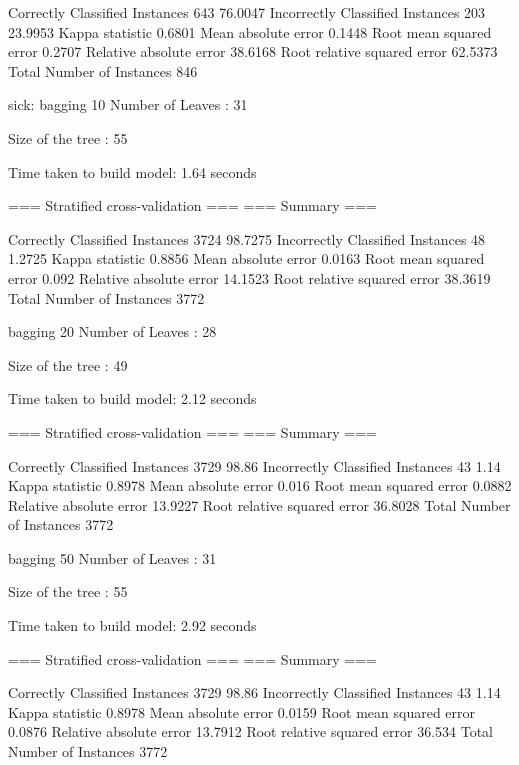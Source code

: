 Correctly Classified Instances         643               76.0047 %
Incorrectly Classified Instances       203               23.9953 %
Kappa statistic                          0.6801
Mean absolute error                      0.1448
Root mean squared error                  0.2707
Relative absolute error                 38.6168 %
Root relative squared error             62.5373 %
Total Number of Instances              846     



sick:
bagging 10
Number of Leaves  : 	31

Size of the tree : 	55




Time taken to build model: 1.64 seconds

=== Stratified cross-validation ===
=== Summary ===

Correctly Classified Instances        3724               98.7275 %
Incorrectly Classified Instances        48                1.2725 %
Kappa statistic                          0.8856
Mean absolute error                      0.0163
Root mean squared error                  0.092 
Relative absolute error                 14.1523 %
Root relative squared error             38.3619 %
Total Number of Instances             3772

bagging 20
Number of Leaves  : 	28

Size of the tree : 	49




Time taken to build model: 2.12 seconds

=== Stratified cross-validation ===
=== Summary ===

Correctly Classified Instances        3729               98.86   %
Incorrectly Classified Instances        43                1.14   %
Kappa statistic                          0.8978
Mean absolute error                      0.016 
Root mean squared error                  0.0882
Relative absolute error                 13.9227 %
Root relative squared error             36.8028 %
Total Number of Instances             3772


bagging 50
Number of Leaves  : 	31

Size of the tree : 	55




Time taken to build model: 2.92 seconds

=== Stratified cross-validation ===
=== Summary ===

Correctly Classified Instances        3729               98.86   %
Incorrectly Classified Instances        43                1.14   %
Kappa statistic                          0.8978
Mean absolute error                      0.0159
Root mean squared error                  0.0876
Relative absolute error                 13.7912 %
Root relative squared error             36.534  %
Total Number of Instances             3772     

